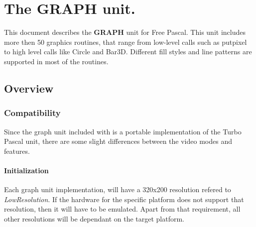 %
%
%
%
%
\chapter{The GRAPH unit.}
This document describes the \textbf{GRAPH} unit for Free Pascal. This unit includes
more then 50 graphics routines, that range from low-level calls such as putpixel
to high level calls like Circle and Bar3D. Different fill styles and line
patterns are supported in most of the routines.

\section{Overview}
\label{se:Overview}

\subsection{Compatibility}
Since the graph unit included with  is a portable implementation of
the Turbo Pascal unit, there are some slight differences between the video
modes and features.

\subsubsection{Initialization}

Each graph unit implementation, will have a 320x200 resolution refered to
\textit{LowResolution}. If the hardware for the specific platform does
not support that resolution, then it will have to be emulated. Apart
from that requirement, all other resolutions will be dependant on the
target platform.

